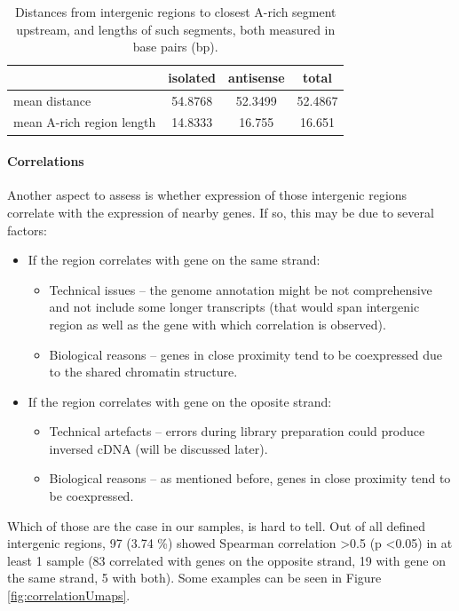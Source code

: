 \begin{table}[htbp]
  \centering
  \begin{tabular}{l|ccc}
    \toprule
     & isolated & antisense & total  \\
    \midrule
    mean distance & 54.8768 & 52.3499 & 52.4867 \\
    mean A-rich region length & 14.8333 & 16.755 & 16.651 \\
    \bottomrule
  \end{tabular}
  \caption{Distances from intergenic regions to closest A-rich segment upstream, and lengths of such segments, both measured in base pairs (bp).}
  \label{tab:polyAstats}
\end{table}


\paragraph{Correlations}

Another aspect to assess is whether expression of those intergenic regions correlate with the expression of nearby genes.
If so, this may be due to several factors:
\begin{itemize}
  \item If the region correlates with gene on the same strand:
  \begin{itemize}
    \item Technical issues – the genome annotation might be not comprehensive and not include some longer transcripts
    (that would span intergenic region as well as the gene with which correlation is observed).
    \item Biological reasons – genes in close proximity tend to be coexpressed due to the shared chromatin structure.
  \end{itemize}
  \item If the region correlates with gene on the oposite strand:
  \begin{itemize}
    \item Technical artefacts – errors during library preparation could produce inversed cDNA (will be discussed later).
    \item Biological reasons – as mentioned before, genes in close proximity tend to be coexpressed.
  \end{itemize}
\end{itemize}

Which of those are the case in our samples, is hard to tell.
Out of all defined intergenic regions, 97 (3.74 \%) showed Spearman correlation \textgreater 0.5 (p \textless 0.05) in at least 1 sample
(83 correlated with genes on the opposite strand, 19 with gene on the same strand, 5 with both).
Some examples can be seen in Figure \ref{fig:correlationUmaps}.

